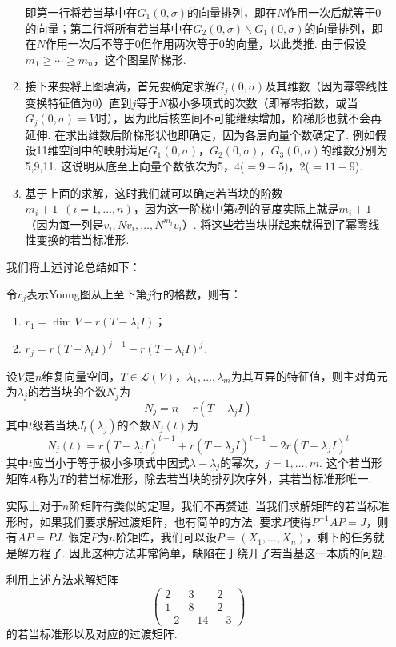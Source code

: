 \begin{enumerate}
\begin{enumerate}
                    即第一行将若当基中在$G_1(0,\sigma)$的向量排列，即在$N$作用一次后就等于0的向量；第二行将所有若当基中在$G_2(0,\sigma)\backslash G_1(0,\sigma)$的向量排列，即在$N$作用一次后不等于0但作用两次等于0的向量，以此类推. 由于假设$m_1\geqslant\cdots\geqslant m_n$，这个图呈阶梯形.

              \item 接下来要将上图填满，首先要确定求解$G_j(0,\sigma)$及其维数（因为幂零线性变换特征值为0）直到$j$等于$N$极小多项式的次数（即幂零指数，或当$G_j(0,\sigma)=V$时），因为此后核空间不可能继续增加，阶梯形也就不会再延伸. 在求出维数后阶梯形状也即确定，因为各层向量个数确定了. 例如假设11维空间中的映射满足$G_1(0,\sigma)$，$G_2(0,\sigma)$，$G_3(0,\sigma)$的维数分别为5,9,11. 这说明从底至上向量个数依次为5，4($=9-5$)，2($=11-9$).

              \item 基于上面的求解，这时我们就可以确定若当块的阶数$m_i+1\enspace(i=1,\ldots,n)$，因为这一阶梯中第$i$列的高度实际上就是$m_i+1$（因为每一列是$v_i,Nv_i,\ldots,N^{m_i}v_i$）. 将这些若当块拼起来就得到了幂零线性变换的若当标准形.
          \end{enumerate}

          我们将上述讨论总结如下：
          \begin{theorem}
              令$r_j$表示Young图从上至下第$j$行的格数，则有：
              \begin{enumerate}
                \item $r_1=\dim V-r(T-\lambda_i I)$；
                \item $r_j=r(T-\lambda_i I)^{j-1}-r(T-\lambda_i I)^j$.
              \end{enumerate}
          \end{theorem}

          \begin{theorem}
              设$V$是$n$维复向量空间，$T\in \mathcal{L}(V)$，$\lambda_1,\ldots,\lambda_m$为其互异的特征值，则主对角元为$\lambda_j$的若当块的个数$N_j$为
              \[N_j=n-r(T-\lambda_jI)\]
              其中$t$级若当块$J_t(\lambda_j)$的个数$N_j(t)$为
              \[N_j(t)=r(T-\lambda_jI)^{t+1}+r(T-\lambda_jI)^{t-1}-2r(T-\lambda_jI)^t\]
              其中$t$应当小于等于极小多项式中因式$\lambda-\lambda_j$的幂次，$j=1,\ldots,m$. 这个若当形矩阵$A$称为$T$的若当标准形，除去若当块的排列次序外，其若当标准形唯一.
          \end{theorem}
          实际上对于$n$阶矩阵有类似的定理，我们不再赘述. 当我们求解矩阵的若当标准形时，如果我们要求解过渡矩阵，也有简单的方法. 要求$P$使得$P^{-1}AP=J$，则有$AP=PJ$. 假定$P$为$n$阶矩阵，我们可以设$P=(X_1,\ldots,X_n)$，剩下的任务就是解方程了. 因此这种方法非常简单，缺陷在于绕开了若当基这一本质的问题.
          \begin{example}
              利用上述方法求解矩阵\[\begin{pmatrix}
                  2 & 3 & 2 \\ 1 & 8 & 2 \\ -2 & -14 & -3
              \end{pmatrix}\]的若当标准形以及对应的过渡矩阵.
          \end{example}


\end{enumerate}
